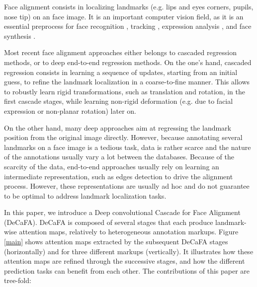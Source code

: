 \documentclass[10pt,twocolumn,letterpaper]{article}
\begin{document}
Face alignment consists in localizing landmarks (e.g. lips and eyes corners, pupils, nose tip) on an face image. It is an important computer vision field, as it is an essential preprocess for face recognition \cite{taigman2014deepface}, tracking \cite{chrysos2018comprehensive}, expression analysis \cite{zhang2018bilateral}, and face synthesis \cite{thies2016face2face}.

Most recent face alignment approaches either belongs to cascaded regression methods, or to deep end-to-end regression methods. On the one's hand, cascaded regression consists in learning a sequence of updates, starting from an initial guess, to refine the landmark localization in a coarse-to-fine manner. This allows to robustly learn rigid transformations, such as translation and rotation, in the first cascade stages, while learning non-rigid deformation (e.g. due to facial expression or non-planar rotation) later on. 

On the other hand, many deep approaches aim at regressing the landmark position from the original image directly. However, because annotating several landmarks on a face image is a tedious task, data is rather scarce and the nature of the annotations usually vary a lot between the databases. Because of the scarcity of the data, end-to-end approaches usually rely on learning an intermediate representation, such as edges detection to drive the alignment process. However, these representations are usually ad hoc and do not guarantee to be optimal to address landmark localization tasks.

In this paper, we introduce a Deep convolutional Cascade for Face Alignment (DeCaFA). DeCaFA is composed of several stages that each produce landmark-wise attention maps, relatively to heterogeneous annotation markups. Figure \ref{main} shows attention maps extracted by the subsequent DeCaFA stages (horizontally) and for three different markups (vertically). It illustrates how these attention maps are refined through the successive stages, and how the different prediction tasks can benefit from each other. The contributions of this paper are tree-fold:
\end{document}

